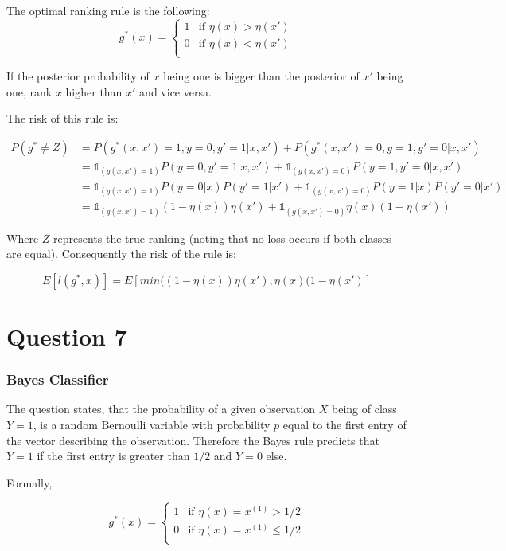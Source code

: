 \documentclass[a4paper, 11pt]{article} %
\begin{document}
The optimal ranking rule is the following:
$$
g^*(x) = \left\{ \begin{array}{ ll} {1} & {\text {if } \eta(x) > \eta(x')} \\
{0} & {\text{if } \eta(x) < \eta(x') } \\
\end{array} \right. $$

If the posterior probability of $x$ being one is bigger than the posterior of $x'$ being one, rank $x$ higher than $x'$ and vice versa.

The risk of this rule is:

\begin{align*}
P(g^* \neq Z) &= P(g^*(x,x') = 1, y = 0, y'=1 | x, x') + P(g^*(x,x') = 0, y = 1, y'=0 | x, x') \\
&= \mathbb{1}_{(g(x,x') = 1)} P(y = 0, y'=1 | x, x') + \mathbb{1}_{(g(x,x') = 0)} P(y = 1, y'=0 | x, x') \\
&= \mathbb{1}_{(g(x,x') = 1)} P(y = 0| x)P(y'=1 |x') + \mathbb{1}_{(g(x,x') = 0)} P(y = 1| x)P(y'=0 | x') \\
&= \mathbb{1}_{(g(x,x') = 1)} (1-\eta(x))\eta(x') + \mathbb{1}_{(g(x,x') = 0)} \eta(x) (1-\eta(x'))
\end{align*}

Where $Z$ represents the true ranking (noting that no loss occurs if both classes are equal). Consequently the risk of the rule is:

$$E\left[ l(g^*,x) \right] = E\left[ min((1-\eta(x))\eta(x'),\eta(x) (1-\eta(x')\right]$$


\section*{Question 7}

\subsubsection*{Bayes Classifier}

The question states, that the probability of a given observation $X$ being of class $Y=1$, is a random Bernoulli variable with probability $p$ equal to the first entry of the vector describing the observation. Therefore the Bayes rule predicts that $Y =1$ if the first entry is greater than $1/2$ and $Y=0$ else. 

Formally,

$$g^*(x) = \left\{ \begin{array}{ ll} {1} & {\text {if } \eta(x) = x ^ { ( 1 ) } >  1/2 } \\
{0} & {\text{if } \eta(x) = x ^ { ( 1 ) }   \leq 1/2 } \\
\end{array} \right. $$
\end{document}
